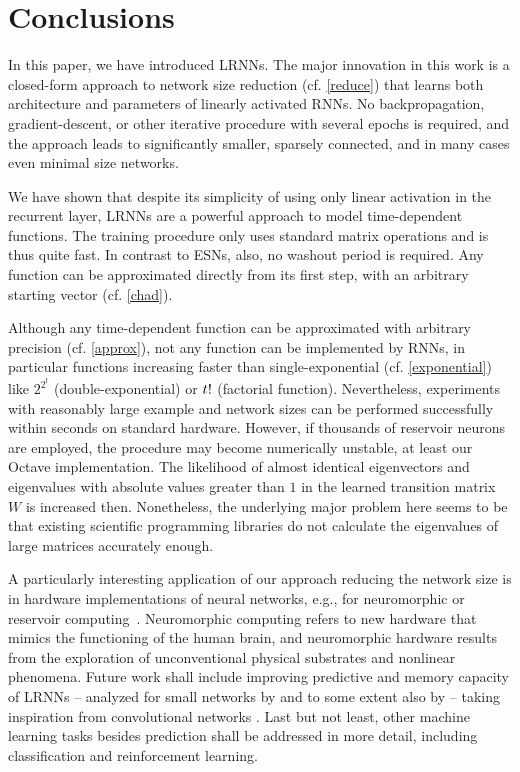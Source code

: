 \documentclass[twoside,11pt]{article}
\theoremstyle{definition}
\begin{document}
\section{Conclusions}\label{conclude}

In this paper, we have introduced LRNNs. The major innovation in this work is a
closed-form approach to network size reduction (cf.
\cref{reduce}) that learns both architecture and parameters of linearly activated RNNs.
No backpropagation, gradient-descent, or other iterative procedure with several
epochs is required, and the approach leads to significantly smaller, sparsely
connected, and in many cases even minimal size networks.

We have shown that despite its simplicity of using only linear activation in the
recurrent layer, LRNNs are a powerful approach to model time-dependent functions.
The training procedure only uses standard matrix operations and is thus quite fast.
In contrast to ESNs, also, no washout period is required. Any
function can be approximated directly from its first step, with an arbitrary
starting vector (cf. \cref{chad}).

Although any time-dependent function can be approximated with arbitrary
precision (cf. \cref{approx}), not any function can be implemented by RNNs,
in particular functions increasing faster than single-exponential (cf.
\cref{exponential}) like $2^{2^t}$ (double-exponential) or $t\/!$
(factorial function). Nevertheless, experiments with reasonably
large example and network sizes can be performed successfully within seconds on
standard hardware.
However, if thousands of reservoir neurons are employed, the procedure may
become numerically unstable, at least our Octave implementation. The likelihood
of almost identical eigenvectors and eigenvalues with absolute values greater
than $1$ in the learned transition matrix $W$ is increased then. Nonetheless,
the underlying major problem here seems to be that existing scientific
programming libraries do not calculate the eigenvalues of large matrices
accurately enough.

A particularly interesting application of our approach reducing the network size
is in hardware implementations of neural networks, e.g., for neuromorphic or
reservoir computing~\citep{Mea90,IL+11,LL17}. Neuromorphic computing refers to
new hardware that mimics the functioning of the human brain, and neuromorphic
hardware results from the exploration of unconventional physical substrates
and nonlinear phenomena. Future work shall include improving predictive and
memory capacity of LRNNs -- analyzed for small networks by \citet{Mar17} and to
some extent also by \citet{CW+16} -- taking inspiration from convolutional
networks \citep{GBC16}. Last but not least, other machine learning tasks besides
prediction shall be addressed in more detail, including classification and
reinforcement learning.
\end{document}
